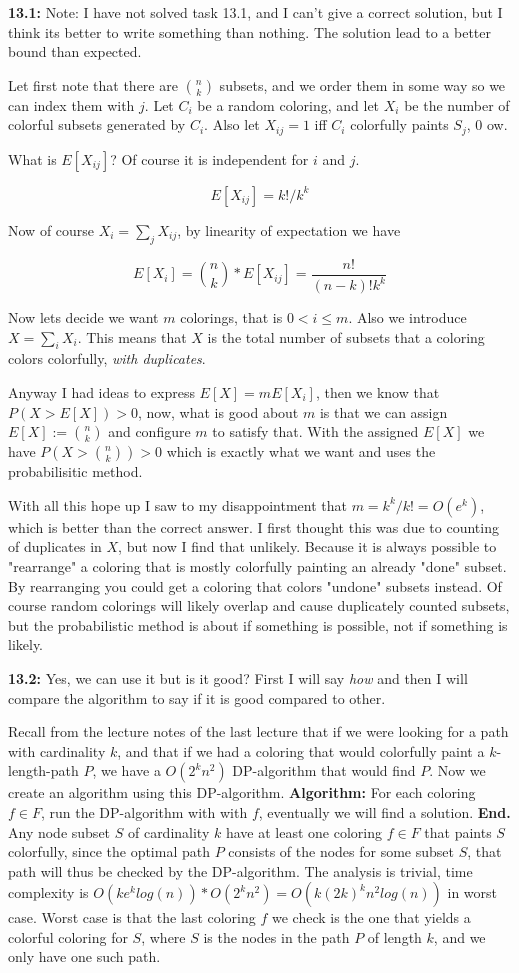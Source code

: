 \documentclass[a4paper,11pt]{article}
\begin{document}
\textbf{13.1:}
Note: I have not solved task 13.1, and I can't give
a correct solution, but I think its better to write
something than nothing. The solution lead
to a better bound than expected.

Let first note that there are ${n \choose k}$ subsets,
and we order them in some way so we can index them with $j$.
Let $C_i$ be a random coloring, and let $X_i$ be the number
of colorful subsets generated by $C_i$. Also let
$X_{ij} = 1$ iff $C_i$ colorfully paints $S_j$, $0$ ow.

What is $E[X_{ij}]$? Of course it is independent for $i$ and $j$.

\[
E[X_{ij}] = k!/k^k
\]

Now of course $X_i = \sum_j X_{ij}$, by linearity of expectation
we have

\[
E[X_i] = {n \choose k} * E[X_{ij}] = \frac{n!}{(n-k)!k^k}
\]

Now lets decide we want $m$ colorings, that is $ 0 < i \leq m$.
Also we introduce $X = \sum_i X_i$. This means that $X$ is the total
number of subsets that a coloring colors colorfully,
\emph{with duplicates}.

Anyway I had ideas to express $E[X] = m E[X_i]$, then we know
that $P(X > E[X]) > 0$, now, what is good about $m$ is that
we can assign $E[X] := {n \choose k}$ and configure $m$ to satisfy
that. With the assigned $E[X]$ we have $P(X > {n \choose k}) > 0$
which is exactly what we want and uses the probabilisitic method.

With all this hope up I saw to my disappointment that
$m = k^k/k! = O(e^k)$, which is better than the correct answer.
I first thought this was due to counting of duplicates in $X$, but
now I find that unlikely. Because it is always possible to
"rearrange" a coloring that is mostly colorfully painting
an already "done" subset. By rearranging you could get a coloring
that colors "undone" subsets instead. Of course random colorings will
likely overlap and cause duplicately counted subsets,
but the probabilistic method is about if something
is possible, not if something is likely.

\textbf{13.2:} Yes, we can use it but is it good?
First I will say \emph{how} and then I will compare the
algorithm to say if it is good compared to other.

Recall from the lecture notes of the last lecture that
if we were looking for a path with cardinality $k$,
and that if we had a coloring that would colorfully
paint a $k$-length-path $P$, we have a $O(2^kn^2)$ DP-algorithm
that would find $P$. Now we create an algorithm using this
DP-algorithm.
\textbf{Algorithm:} For each
coloring $f \in F$, run the DP-algorithm with
with $f$, eventually we will find a solution.  \textbf{End.}
Any node subset $S$ of cardinality $k$
have at least one coloring $f \in F$ that paints $S$ colorfully,
since the optimal path $P$ consists of the nodes for some subset $S$,
that path will thus be checked by the DP-algorithm. The analysis
is trivial, time complexity is
$O(ke^klog(n))*O(2^kn^2) = O(k(2k)^kn^2log(n))$ in worst case.
Worst case is that the last coloring $f$ we check is the
one that yields a colorful coloring for $S$, where $S$ is the
nodes in the path $P$ of length $k$, and we only have one such path.
\end{document}
